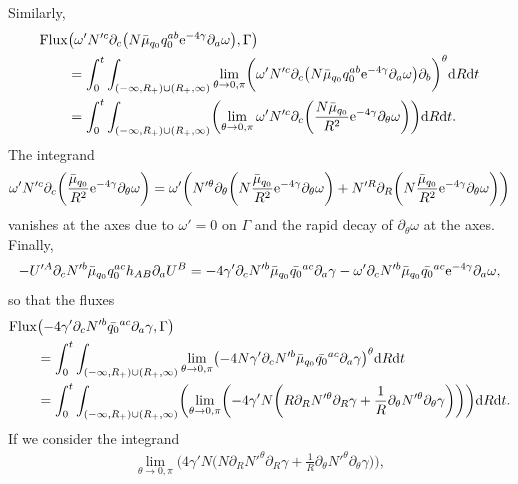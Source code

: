 \documentclass[11pt]{article}
\numberwithin{equation}{section}
\def\ptl{\partial}%
\numberwithin{equation}{section}
\begin{document}
Similarly,
\begin{align*}
& {\rm Flux} \bigl(\omega' N'^c \ptl_c \bigl(N \bar{\mu}_{q_0} q^{ab}_0 {\rm e}^{-4\gamma} \ptl_a \omega\bigr), \Gamma\bigr) \notag\\
&{}\qquad{}=
\int^t_0 \int_{ (-\infty, R_+) \cup (R_+, \infty) } \lim_{\theta \to 0, \pi} \biggl( \omega' N'^c \ptl_c \bigl(N \bar{\mu}_{q_0} q^{ab}_0 {\rm e}^{-4\gamma} \ptl_a \omega\bigr) \ptl_b \biggr)^\theta {\rm d}R {\rm d}t \\
&{}\qquad{}= \int^t_0 \int_{ (-\infty, R_+) \cup (R_+, \infty) } \biggl( \lim_{\theta \to 0, \pi} \omega' N'^c \ptl_c \biggl(\frac{N \bar{\mu}_{q_0}}{R^2} {\rm e}^{-4\gamma} \ptl_\theta \omega\biggr) \biggr) {\rm d}R {\rm d}t.
\end{align*}
The integrand
\begin{align*}
 \omega' N'^c \ptl_c \biggl(\frac{\bar{\mu}_{q_0}}{R^2} {\rm e}^{-4\gamma} \ptl_\theta \omega\biggr)= \omega' \biggl(N'^\theta \ptl_\theta \biggl(N \frac{\bar{\mu}_{q_0}}{R^2} {\rm e}^{-4\gamma} \ptl_\theta \omega\biggr) + N'^ R \ptl_R \biggl(N \frac{\bar{\mu}_{q_0}}{R^2} {\rm e}^{-4\gamma} \ptl_\theta \omega\biggr)\biggr)
\end{align*}
vanishes at the axes due to $\omega' =0$ on $\Gamma$ and the rapid decay of $\ptl_\theta \omega$ at the axes.
Finally,
\begin{align*}
-U'^A \ptl_c N'^b \bar{\mu}_{q_0} q^{ac}_0 h_{AB} \ptl_a U^B = -4\gamma' \ptl_c N'^b \bar{\mu}_{q_0} \bar{q_0}^{ac} \ptl_a \gamma
-\omega' \ptl_c N'^b \bar{\mu}_{q_0} \bar{q_0}^{ac} {\rm e}^{-4\gamma} \ptl_a \omega,
\end{align*}
so that the fluxes
\begin{align*}
& {\rm Flux} \bigl(-4\gamma' \ptl_c N'^b \bar{q_0}^{ac} \ptl_a \gamma, \Gamma\bigr) \notag\\
&\qquad{}= \int^t_0 \int_{ (-\infty, R_+) \cup (R_+, \infty) } \lim_{\theta \to 0, \pi} \bigl( -4N \gamma' \ptl_c N'^b \bar{\mu}_{q_0} \bar{q_0}^{ac} \ptl_a \gamma \bigr)^\theta {\rm d}R {\rm d}t \notag\\
&\qquad{}= \int^t_0 \int_{ (-\infty, R_+) \cup (R_+, \infty) }\biggl(\lim_{\theta \to 0, \pi} \biggl(-4 \gamma' N \biggl(R \ptl_R N'^\theta \ptl_R \gamma + \frac{1}{R} \ptl_\theta N'^\theta \ptl_\theta \gamma\biggr)\biggr) \biggr) {\rm d}R {\rm d}t.
\end{align*}
If we consider the integrand
\begin{align*}
\lim_{\theta \to 0, \pi} \biggl(4 \gamma' N \biggl(N\ptl_R N'^\theta \ptl_R \gamma + \frac{1}{R} \ptl_\theta N'^\theta \ptl_\theta \gamma\biggr)\biggr),
\end{align*}
\end{document}
